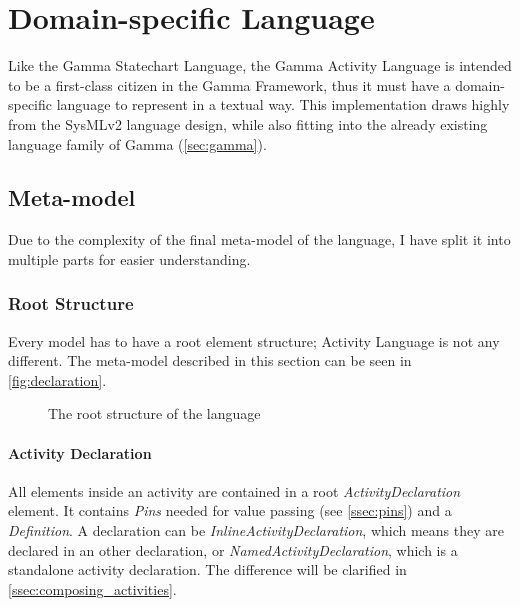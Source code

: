 \clearpage\section{Domain-specific Language}

Like the Gamma Statechart Language, the Gamma Activity Language is intended to be a first-class citizen in the Gamma Framework, thus it must have a domain-specific language to represent in a textual way. This implementation draws highly from the SysMLv2\cite{omg_sysml_v2} language design, while also fitting into the already existing language family of Gamma (\autoref{sec:gamma}).

\subsection{Meta-model}

Due to the complexity of the final meta-model of the language, I have split it into multiple parts for easier understanding.

\subsubsection*{Root Structure}\label{ssec:root_structure}

Every model has to have a root element structure; Activity Language is not any different. The meta-model described in this section can be seen in \autoref{fig:declaration}.

\begin{figure}[!ht]
	\centering
	
	\caption{The root structure of the language}
	\label{fig:declaration}
\end{figure}

\paragraph{Activity Declaration}\label{par:activity_declaration}

All elements inside an activity are contained in a root \emph{ActivityDeclaration} element. It contains \emph{Pins} needed for value passing (see \autoref{ssec:pins}) and a \emph{Definition}. A declaration can be \emph{InlineActivityDeclaration}, which means they are declared in an other declaration, or \emph{NamedActivityDeclaration}, which is a standalone activity declaration. The difference will be clarified in \autoref{ssec:composing_activities}.

